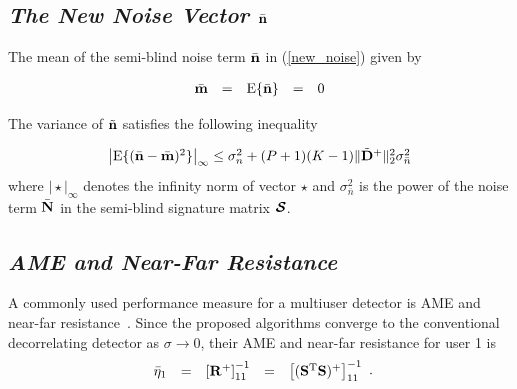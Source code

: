 \documentclass[a4paper,10pt,fleqn, twocolumn]{IEEETran}
\newcommand{\bm}{{\bf m}}
\newcommand{\bn}{{\bf n}}
\newcommand{\bN}{{\bf N}}
\newcommand{\bS}{{\bf S}}
\newcommand{\bD}{{\bf D}}
\newcommand{\bR}{{\bf R}}
\newcommand{\bcS}{{\mbox {\boldmath ${\cal S}$}}}
\begin{document}
\subsection{\em The New Noise Vector $\bar{\bn}$}
The mean of the semi-blind noise term $\bar{\bn}$ in
(\ref{new_noise}) given by

\begin{equation}
\begin{array}{rcccl}
\bar{\bm}&=&{\rm E}\{\bar{\bn}\}&=&0
\end{array}
\end{equation}

\noindent The variance of $\tilde{\bn}$ satisfies the following
inequality

\begin{equation}\hspace{-0.0in}
\begin{array}{l}
\bigl|{\rm
E}\{(\bar{\bn}-\bar{\bm})^2\}\bigr|_{\infty}\leq\sigma_n^2+(P+1)(K-1)\|\tilde{\bD}^+\|_2^2\sigma_{\bar{n}}^2
\end{array} \label{noise_mean}
\end{equation}
\noindent where $\bigl|\star\bigr|_{\infty}$ denotes the infinity
norm of vector $\star$ and $\sigma_{\bar{n}}^2$ is the power of
the noise term $\bar{\bN}$ in the semi-blind signature matrix
$\bcS$.

\subsection{\em AME and Near-Far Resistance}
A commonly used performance measure for a multiuser detector is
AME and near-far resistance~\cite{Verd98}. Since the proposed
algorithms converge to the conventional decorrelating detector as
$\sigma\rightarrow 0$, their AME and near-far resistance for user
1 is
\begin{equation}
\begin{array}{rcccl}
\bar{\eta}_1&=&\left[\bR^{+}\right]_{11}^{-1}&=&\left[(\bS^{\rm
T}\bS)^{+}\right]_{11}^{-1}
\end{array}.
\end{equation}
\end{document}
